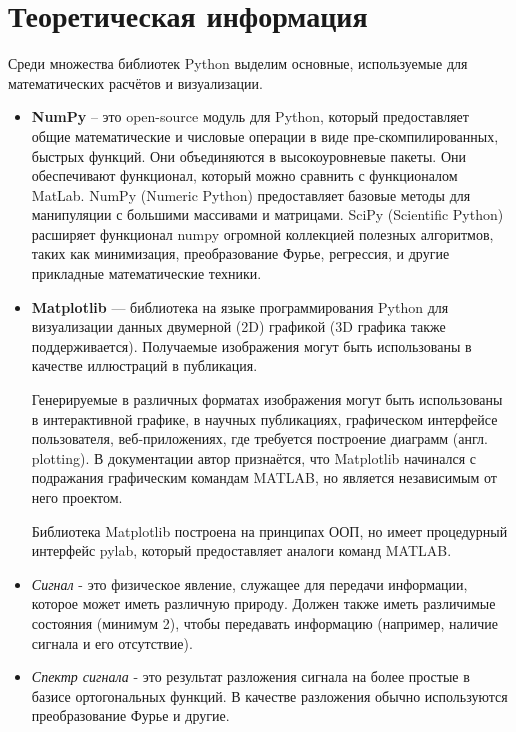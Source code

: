 \section{Теоретическая информация}
Среди множества библиотек Python выделим основные, используемые для математических расчётов и визуализации.
\begin{itemize}
	\item \textbf{NumPy} -- это open-source модуль для Python, который предоставляет общие математические и числовые операции в виде пре-скомпилированных, быстрых функций. Они объединяются в высокоуровневые пакеты. Они обеспечивают функционал, который можно сравнить с функционалом MatLab. NumPy (Numeric Python) предоставляет базовые методы для манипуляции с большими массивами и матрицами. SciPy (Scientific Python) расширяет функционал numpy огромной коллекцией полезных алгоритмов, таких как минимизация, преобразование Фурье, регрессия, и другие прикладные математические техники.
	
	\item \textbf{Matplotlib} — библиотека на языке программирования Python для визуализации данных двумерной (2D) графикой (3D графика также поддерживается). Получаемые изображения могут быть использованы в качестве иллюстраций в публикация.
	
	Генерируемые в различных форматах изображения могут быть использованы в интерактивной графике, в научных публикациях, графическом интерфейсе пользователя, веб-приложениях, где требуется построение диаграмм (англ. plotting). В документации автор признаётся, что Matplotlib начинался с подражания графическим командам MATLAB, но является независимым от него проектом.
	
	Библиотека Matplotlib построена на принципах ООП, но имеет процедурный интерфейс pylab, который предоставляет аналоги команд MATLAB.
	
	\item \textit{Сигнал} - это физическое явление, служащее для передачи информации, которое может иметь различную природу. Должен также иметь различимые состояния (минимум 2), чтобы передавать информацию (например, наличие сигнала и его отсутствие).
	
	\item \textit{Спектр сигнала} - это результат разложения сигнала на более простые в базисе ортогональных функций. В качестве разложения обычно используются преобразование Фурье и другие.
	

\end{itemize}
